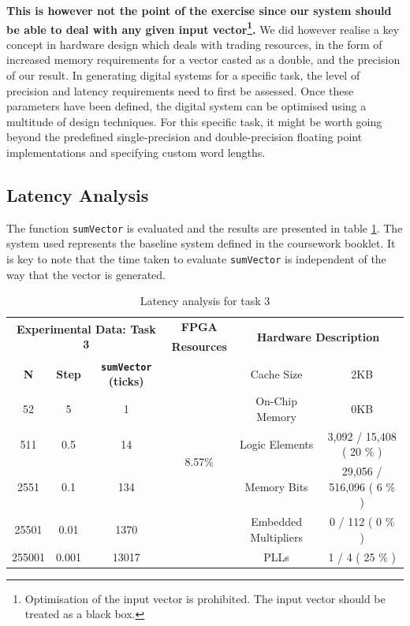 \documentclass{article}
\begin{document}
\textbf{This is however not the point of the exercise since our system should be able to deal with any given input vector\footnote{Optimisation of the input vector is prohibited. The input vector should be treated as a black box.}.} We did however realise a key concept in hardware design which deals with trading resources, in the form of increased memory requirements for a vector casted as a double, and the precision of our result. In generating digital systems for a specific task, the level of precision and latency requirements need to first be assessed. Once these parameters have been defined, the digital system can be optimised using a multitude of design techniques. For this specific task, it might be worth going beyond the predefined single-precision and double-precision floating point implementations and specifying custom word lengths.\\


\subsection{Latency Analysis}

The function {\tt sumVector} is evaluated and the results are presented in table \ref{tab:baseline}. The system used represents the baseline system defined in the coursework booklet. It is key to note that the time taken to evaluate {\tt sumVector} is independent of the way that the vector is generated.\\

\begin{table}[H]
  \centering
    \begin{tabular}{|c|c|c|c|c|c|}
    \hline
    \multicolumn{3}{|c|}{\multirow{2}[2]{*}{\textbf{Experimental Data: Task 3}}} & \textbf{FPGA} & \multicolumn{2}{c|}{\multirow{2}[2]{*}{\textbf{Hardware Description}}}\\
    \multicolumn{3}{|c|}{} & \textbf{Resources} & \multicolumn{2}{c|}{}\\
    \hline
    \textbf{N} & \textbf{Step} & \textbf{{\tt sumVector} (ticks)} & \multirow{6}{*}{8.57\%} & Cache Size & 2KB \\
\cline{1-3}\cline{5-6}    52    & 5     & 1     &       & On-Chip Memory & 0KB \\
\cline{1-3}\cline{5-6}    511   & 0.5   & 14    &       & Logic Elements & 3,092 / 15,408 ( 20 \% ) \\
\cline{1-3}\cline{5-6}    2551  & 0.1   & 134   &       & Memory Bits & 29,056 / 516,096 ( 6 \% ) \\
\cline{1-3}\cline{5-6}    25501 & 0.01  & 1370  &       & Embedded Multipliers & 0 / 112 ( 0 \% ) \\
\cline{1-3}\cline{5-6}    255001 & 0.001 & 13017 &       & PLLs  & 1 / 4 ( 25 \% ) \\
    \hline
    \end{tabular}%
  \caption{Latency analysis for task 3}
  \label{tab:baseline}%
\end{table}%
\end{document}
